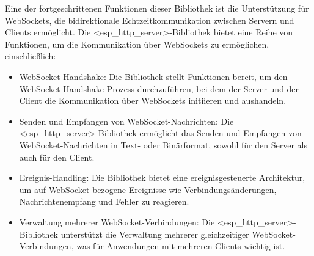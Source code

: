 Eine der fortgeschrittenen Funktionen dieser Bibliothek ist die Unterstützung für WebSockets, die bidirektionale Echtzeitkommunikation zwischen Servern und Clients ermöglicht.
Die <esp\_http\_server>-Bibliothek bietet eine Reihe von Funktionen, um die Kommunikation über WebSockets zu ermöglichen, einschließlich:
\begin{itemize}
    \item WebSocket-Handshake: Die Bibliothek stellt Funktionen bereit, um den WebSocket-Handshake-Prozess durchzuführen, bei dem der Server und der Client 
    \newline die Kommunikation über WebSockets initiieren und aushandeln.
    \item Senden und Empfangen von WebSocket-Nachrichten: Die <esp\_http\_server>-Bibliothek ermöglicht das Senden und Empfangen von WebSocket-Nachrichten in Text- oder Binärformat, sowohl für den Server als auch für den Client.
    \item Ereignis-Handling: Die Bibliothek bietet eine ereignisgesteuerte Architektur, um auf WebSocket-bezogene Ereignisse wie Verbindungsänderungen, Nachrichtenempfang und Fehler zu reagieren.
    \item Verwaltung mehrerer WebSocket-Verbindungen: Die <esp\_http\_server>-Bibliothek unterstützt die Verwaltung mehrerer gleichzeitiger WebSocket-Verbindungen, was für Anwendungen mit mehreren Clients wichtig ist.
\end{itemize}

